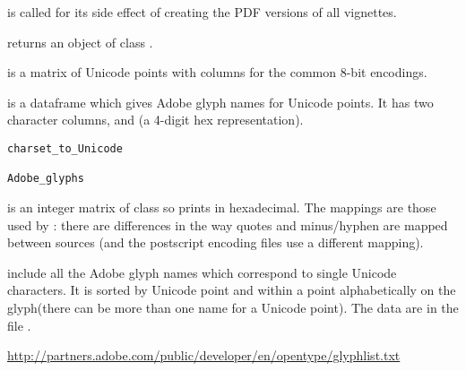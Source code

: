 %
\begin{Value}
 is called for its side effect of creating the
PDF versions of all vignettes.

 returns an object of class .
\end{Value}
%
\begin{Description}\relax
{} is a matrix of Unicode points with columns
for the common 8-bit encodings.

 is a dataframe which gives Adobe glyph names for
Unicode points. It has two character columns,  and
 (a 4-digit hex representation).
\end{Description}
%
\begin{Usage}
\begin{verbatim}
charset_to_Unicode

Adobe_glyphs
\end{verbatim}
\end{Usage}
%
\begin{Details}\relax
{} is an integer matrix of class
 so prints in hexadecimal.
The mappings are those used by : there are differences
in the way quotes and minus/hyphen are mapped between sources (and the
postscript encoding files use a different mapping).

 include all the Adobe glyph names which correspond to
single Unicode characters.  It is sorted by Unicode point and within a
point alphabetically on the glyph(there can be more than one name for
a Unicode point).  The data are in the file
.
\end{Details}
%
\begin{Source}\relax
\url{http://partners.adobe.com/public/developer/en/opentype/glyphlist.txt}
\end{Source}
%
\begin{Examples}
\end{Examples}
